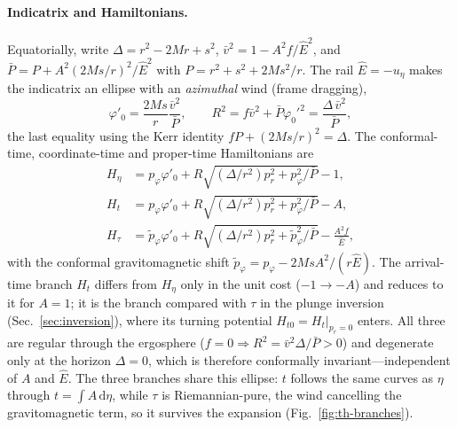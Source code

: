 \documentclass[
    aps, prd, twocolumn, superscriptaddress,
    showpacs, nofootinbib, floatfix
]{revtex4-2}
\newcommand{\Ehat}{\hat E}
\newcommand{\dd}{\mathrm{d}}
\begin{document}
\paragraph{Indicatrix and Hamiltonians.} Equatorially, write
$\Delta=r^2-2Mr+s^2$, $\bar v^2=1-A^2f/\Ehat^2$, and
$\bar P=P+A^2(2Ms/r)^2/\Ehat^2$ with $P=r^2+s^2+2Ms^2/r$. The rail
$\Ehat=-u_\eta$ makes the indicatrix an ellipse with an \emph{azimuthal} wind
(frame dragging),
\begin{equation}
    \varphi'_0=\frac{2Ms}{r}\frac{\bar v^2}{\bar P},\qquad
    R^2=f\bar v^2+\bar P\varphi_0'^2=\frac{\Delta\,\bar v^2}{\bar P},
    \label{eq:tk-ind}
\end{equation}
the last equality using the Kerr identity $fP+(2Ms/r)^2=\Delta$. The
conformal-time, coordinate-time and proper-time Hamiltonians are
\begin{align}
    H_\eta&=p_\varphi\varphi'_0
        +R\sqrt{(\Delta/r^2)p_r^2+p_\varphi^2/\bar P}-1,
    \label{eq:Heta}\\
    H_t&=p_\varphi\varphi'_0
        +R\sqrt{(\Delta/r^2)p_r^2+p_\varphi^2/\bar P}-A,
    \label{eq:Ht-tk}\\
    H_\tau&=\tilde p_\varphi\varphi'_0
        +R\sqrt{(\Delta/r^2)p_r^2+\tilde p_\varphi^2/\bar P}-\frac{A^2 f}{\Ehat},
    \label{eq:Htau-tk}
\end{align}
with the conformal gravitomagnetic shift
$\tilde p_\varphi=p_\varphi-2MsA^2/(r\Ehat)$. The arrival-time branch $H_t$ differs
from $H_\eta$ only in the unit cost ($-1\to-A$) and reduces to it for $A=1$; it is
the branch compared with $\tau$ in the plunge inversion
(Sec.~\ref{sec:inversion}), where its turning potential
$H_{t0}=H_t|_{p_r=0}$ enters. All three are regular through the
ergosphere ($f=0\Rightarrow R^2=\bar v^2\Delta/\bar P>0$) and degenerate only at
the horizon $\Delta=0$, which is therefore conformally invariant---independent of
$A$ and $\Ehat$. The three branches share this ellipse: $t$ follows the same
curves as $\eta$ through $t=\int A\,\dd\eta$, while $\tau$ is Riemannian-pure, the
wind cancelling the gravitomagnetic term, so it survives the expansion
(Fig.~\ref{fig:th-branches}).
\end{document}
